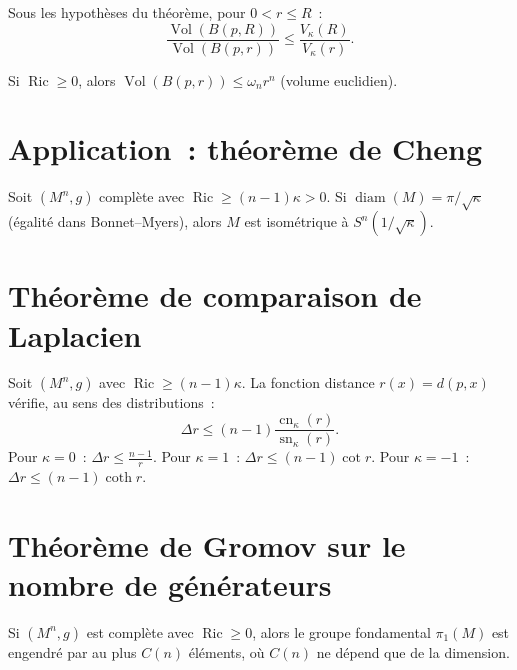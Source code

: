 \begin{corollaire}
Sous les hypoth\`eses du th\'eor\`eme, pour $0 < r \leq R$~:
\[
    \frac{\operatorname{Vol}(B(p, R))}{\operatorname{Vol}(B(p, r))}
    \leq \frac{V_\kappa(R)}{V_\kappa(r)}.
\]
\end{corollaire}

\begin{corollaire}
Si $\operatorname{Ric} \geq 0$, alors
$\operatorname{Vol}(B(p, r)) \leq \omega_n r^n$ (volume euclidien).
\end{corollaire}

\section{Application~: th\'eor\`eme de Cheng}

\begin{theoreme}[Cheng]
Soit $(M^n, g)$ compl\`ete avec $\operatorname{Ric} \geq (n-1)\kappa > 0$.
Si $\operatorname{diam}(M) = \pi/\sqrt{\kappa}$ (\'egalit\'e dans Bonnet--Myers),
alors $M$ est isom\'etrique \`a $S^n(1/\sqrt{\kappa})$.
\end{theoreme}

\section{Th\'eor\`eme de comparaison de Laplacien}

\begin{theoreme}
Soit $(M^n, g)$ avec $\operatorname{Ric} \geq (n-1)\kappa$. La fonction distance
$r(x) = d(p, x)$ v\'erifie, au sens des distributions~:
\[
    \Delta r \leq (n-1)\frac{\operatorname{cn}_\kappa(r)}{\operatorname{sn}_\kappa(r)}.
\]
Pour $\kappa = 0$~: $\Delta r \leq \frac{n-1}{r}$.
Pour $\kappa = 1$~: $\Delta r \leq (n-1)\cot r$.
Pour $\kappa = -1$~: $\Delta r \leq (n-1)\coth r$.
\end{theoreme}

\section{Th\'eor\`eme de Gromov sur le nombre de g\'en\'erateurs}

\begin{theoreme}[Gromov]
Si $(M^n, g)$ est compl\`ete avec $\operatorname{Ric} \geq 0$, alors le groupe
fondamental $\pi_1(M)$ est engendr\'e par au plus $C(n)$ \'el\'ements, o\`u $C(n)$
ne d\'epend que de la dimension.
\end{theoreme}

